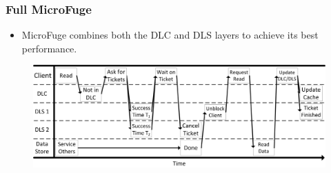 \documentclass{beamer}
\begin{document}
\begin{frame}
  \frametitle{Full MicroFuge}
  \begin{itemize}
  \item
    MicroFuge combines both the DLC and DLS layers to achieve its best
    performance.
  \end{itemize}
  \begin{figure}
    \begin{center}
      \centerline{\includegraphics[scale=0.60]{img/RequestTimelineHorizontal.png}}
    \end{center}
  \end{figure}
\end {frame}



\end{document}
